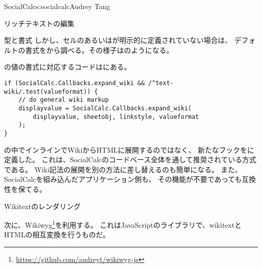 \begin{aosachapter}{SocialCalc}{s:socialcalc}{Audrey Tang}
\begin{aosasect1}{リッチテキストの編集}
\begin{aosasect2}{型と書式}
しかし、セルのあるいはが明示的に定義されていない場合は、
デフォルトの書式をから調べる。その様子はのようになる。



\noindent
{}の値の書式に対応するコードはにある。

\begin{verbatim}
if (SocialCalc.Callbacks.expand_wiki && /^text-wiki/.test(valueformat)) {
    // do general wiki markup
    displayvalue = SocialCalc.Callbacks.expand_wiki(
        displayvalue, sheetobj, linkstyle, valueformat
    );
}
\end{verbatim}

の中でインラインでWikiからHTMLに展開するのではなく、
新たなフックをに定義した。
これは、SocialCalcのコードベース全体を通して推奨されている方式である。
Wiki記法の展開を別の方法に差し替えるのも簡単になる。
また、SocialCalcを組み込んだアプリケーション側も、
その機能が不要であっても互換性を保てる。

\end{aosasect2}

\begin{aosasect2}{Wikitextのレンダリング}

次に、Wikiwyg\footnote{\url{https://github.com/audreyt/wikiwyg-js}}を利用する。
これはJavaScriptのライブラリで、wikitextとHTMLの相互変換を行うものだ。


\end{aosasect2}
\end{aosasect1}
\end{aosachapter}
